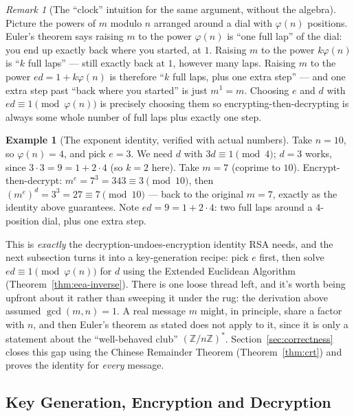 \documentclass[11pt]{article}
\theoremstyle{definition}
\newtheorem{example}[theorem]{Example}
\theoremstyle{remark}
\newtheorem{remark}[theorem]{Remark}
\begin{document}
\begin{remark}[The ``clock'' intuition for the same argument, without the algebra]
Picture the powers of $m$ modulo $n$ arranged around a dial with $\varphi(n)$ positions. Euler's theorem says raising $m$ to the power $\varphi(n)$ is ``one full lap'' of the dial: you end up exactly back where you started, at $1$. Raising $m$ to the power $k\varphi(n)$ is ``$k$ full laps'' — still exactly back at $1$, however many laps. Raising $m$ to the power $ed=1+k\varphi(n)$ is therefore ``$k$ full laps, plus one extra step'' — and one extra step past ``back where you started'' is just $m^1=m$. Choosing $e$ and $d$ with $ed\equiv1\pmod{\varphi(n)}$ is precisely choosing them so encrypting-then-decrypting is always some whole number of full laps plus exactly one step.
\end{remark}



\begin{example}[The exponent identity, verified with actual numbers]\label{ex:exponent-identity}
Take $n=10$, so $\varphi(n)=4$, and pick $e=3$. We need $d$ with $3d\equiv1\pmod4$; $d=3$ works, since $3\cdot3=9=1+2\cdot4$ (so $k=2$ here). Take $m=7$ (coprime to $10$). Encrypt-then-decrypt: $m^e=7^3=343\equiv3\pmod{10}$, then $(m^e)^d=3^3=27\equiv7\pmod{10}$ — back to the original $m=7$, exactly as the identity above guarantees. Note $ed=9=1+2\cdot4$: two full laps around a $4$-position dial, plus one extra step.
\end{example}


This is \emph{exactly} the decryption-undoes-encryption identity RSA needs, and the next subsection turns it into a key-generation recipe: pick $e$ first, then solve $ed\equiv1\pmod{\varphi(n)}$ for $d$ using the Extended Euclidean Algorithm (Theorem~\ref{thm:eea-inverse}). There is one loose thread left, and it's worth being upfront about it rather than sweeping it under the rug: the derivation above assumed $\gcd(m,n)=1$. A real message $m$ might, in principle, share a factor with $n$, and then Euler's theorem as stated does not apply to it, since it is only a statement about the ``well-behaved club'' $(\mathbb{Z}/n\mathbb{Z})^*$. Section~\ref{sec:correctness} closes this gap using the Chinese Remainder Theorem (Theorem~\ref{thm:crt}) and proves the identity for \emph{every} message.

\subsection{Key Generation, Encryption and Decryption}\label{sec:rsa-construction}
\end{document}
